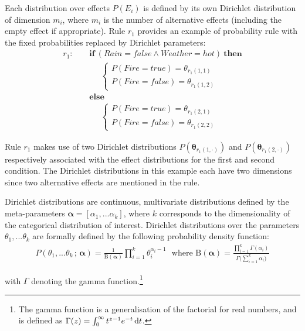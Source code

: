 Each distribution over effects $P(E_i)$ is defined by its own Dirichlet distribution of dimension $m_i$, where $m_i$ is the number of alternative effects (including the empty effect if appropriate).  Rule $r_{1}$ provides an example of probability rule with the fixed probabilities replaced by Dirichlet parameters:
\begin{align*}
r_{1}: \ \ \ \ \ & \textbf{if} \ (\mathit{Rain}\!=\!\mathit{false} \land \mathit{Weather}\!=\!\mathit{hot}) \ \textbf{then} \\
& \;\;\;\;\;  \begin{cases}
 P(\mathit{Fire}\!=\!\mathit{true}) = \theta_{r_{1}(1,1)} \\ 
P(\mathit{Fire}\!=\!\mathit{false}) = \theta_{r_{1}(1,2)}
\end{cases} \\ 
& \textbf{else} \\
& \;\;\;\;\; \begin{cases}
P(\mathit{Fire}\!=\!\mathit{true}) = \theta_{r_{1}(2,1)} \\
P(\mathit{Fire}\!=\!\mathit{false}) = \theta_{r_{1}(2,2)}
\end{cases} 
\end{align*}


Rule $r_{1}$ makes use of two Dirichlet distributions $P(\boldsymbol\theta_{r_{1}(1,\cdot)})$ and $P(\boldsymbol\theta_{r_{1}(2,\cdot)})$ respectively associated with the effect distributions for the first and second condition.  The Dirichlet distributions in this example each have two dimensions since two alternative effects are mentioned in the rule. 

Dirichlet distributions are continuous, multivariate distributions defined by the meta-parameters $\boldsymbol\alpha = [\alpha_1,... \alpha_k]$, where $k$ corresponds to the dimensionality of the categorical distribution of interest.  Dirichlet distributions over the parameters $\theta_1,... \theta_k$ are formally defined by the following probability density function:
\begin{align}
P(\theta_1,...\theta_k  \, ; \, \boldsymbol\alpha) = \frac{1}{\mathrm{B}(\boldsymbol\alpha)} \prod_{i=1}^k \theta_i^{\alpha_i - 1} \ \ \ \text{where } \mathrm{B}(\boldsymbol\alpha) = \frac{\prod_{i=1}^k \Gamma(\alpha_i)}{\Gamma\bigl(\sum_{i=1}^k \alpha_i\bigr)}
\end{align}

with $\Gamma$ denoting the gamma function.\footnote{The gamma function is a generalisation of the factorial for real numbers, and is defined as $\Gamma(z) = \int_0^\infty  t^{z-1} e^{-t}\,{\rm d}t$.}

